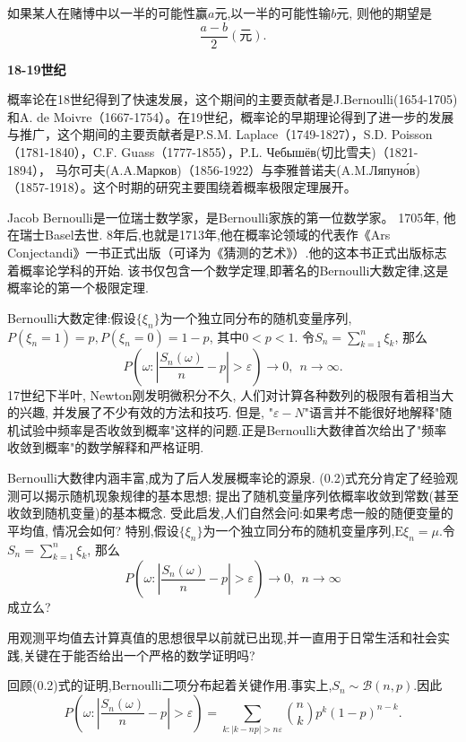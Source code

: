 如果某人在赌博中以一半的可能性赢$a$元,以一半的可能性输$b$元, 则他的期望是\begin{equation}
\frac{a-b}{2} (\text{元}).
\end{equation}

\textbf{18-19世纪}

概率论在18世纪得到了快速发展，这个期间的主要贡献者是J.Bernoulli(1654-1705)和A. de Moivre（1667-1754）。在19世纪，概率论的早期理论得到了进一步的发展与推广，这个期间的主要贡献者是P.S.M. Laplace（1749-1827），S.D. Poisson（1781-1840），C.F. Guass（1777-1855），P.L. Чебышёв(切比雪夫)（1821-1894）， 马尔可夫(A.A.Марков)（1856-1922）与李雅普诺夫(A.M.Ляпуно́в)（1857-1918）。这个时期的研究主要围绕着概率极限定理展开。

Jacob Bernoulli是一位瑞士数学家，是Bernoulli家族的第一位数学家。 1705年, 他在瑞士Basel去世. 8年后,也就是1713年,他在概率论领域的代表作《Ars Conjectandi》一书正式出版（可译为《猜测的艺术》）.他的这本书正式出版标志着概率论学科的开始. 该书仅包含一个数学定理,即著名的Bernoulli大数定律,这是概率论的第一个极限定理.

Bernoulli大数定律:假设$\{\xi_n\}$为一个独立同分布的随机变量序列,$P(\xi_n = 1) = p, P(\xi_n = 0) = 1-p$, 其中$0<p<1$. 令$S_n = \sum_{k=1}^{n}\xi_k$, 那么
\begin{equation}
P\left(\omega:\left|\frac{S_n(\omega)}{n}-p\right|>\varepsilon \right)\to 0,~~n\to\infty.
\end{equation}
17世纪下半叶, Newton刚发明微积分不久, 人们对计算各种数列的极限有着相当大的兴趣, 并发展了不少有效的方法和技巧. 但是, "$\varepsilon-N$"语言并不能很好地解释"随机试验中频率是否收敛到概率"这样的问题.正是Bernoulli大数律首次给出了"频率收敛到概率"的数学解释和严格证明.

Bernoulli大数律内涵丰富,成为了后人发展概率论的源泉. (0.2)式充分肯定了经验观测可以揭示随机现象规律的基本思想; 提出了随机变量序列依概率收敛到常数(甚至收敛到随机变量)的基本概念. 受此启发,人们自然会问:如果考虑一般的随便变量的平均值, 情况会如何? 特别,假设$\{\xi_n\}$为一个独立同分布的随机变量序列,$\mathrm{E}\xi_n = \mu$.令$S_n = \sum_{k=1}^{n}\xi_k$, 那么\begin{equation}
P\left(\omega:\left|\frac{S_n(\omega)}{n}-p\right|>\varepsilon \right)\to 0,~~n\to\infty
\end{equation}成立么?

用观测平均值去计算真值的思想很早以前就已出现,并一直用于日常生活和社会实践,关键在于能否给出一个严格的数学证明吗?

回顾(0.2)式的证明,Bernoulli二项分布起着关键作用.事实上,$S_n\sim \mathcal{B}(n,p)$.因此
\begin{equation}
P\left(\omega:\left|\frac{S_n(\omega)}{n}-p\right|>\varepsilon \right)	= \sum_{k:|k-np|>n\varepsilon}\binom{n}{k}p^k(1-p)^{n-k}.	
\end{equation}

